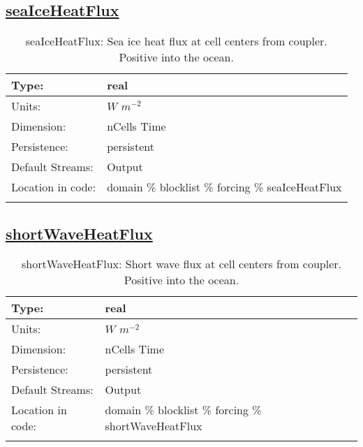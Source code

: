 \subsection[seaIceHeatFlux]{\hyperref[sec:var_tab_forcing]{seaIceHeatFlux}}
\label{subsec:var_sec_forcing_seaIceHeatFlux}
\begin{center}
\begin{longtable}{| p{2.0in} | p{4.0in} |}
        \hline 
        Type: & real \\
        \hline 
        Units: & $W$ $m^{-2}$ \\
        \hline 
        Dimension: & nCells Time \\
        \hline 
        Persistence: & persistent \\
        \hline 
		 Default Streams: & Output  \\
        \hline 
		 Location in code: & domain \% blocklist \% forcing \% seaIceHeatFlux \\
		 \hline 
    \caption{seaIceHeatFlux: Sea ice heat flux at cell centers from coupler. Positive into the ocean.}
\end{longtable}
\end{center}
\subsection[shortWaveHeatFlux]{\hyperref[sec:var_tab_forcing]{shortWaveHeatFlux}}
\label{subsec:var_sec_forcing_shortWaveHeatFlux}
\begin{center}
\begin{longtable}{| p{2.0in} | p{4.0in} |}
        \hline 
        Type: & real \\
        \hline 
        Units: & $W$ $m^{-2}$ \\
        \hline 
        Dimension: & nCells Time \\
        \hline 
        Persistence: & persistent \\
        \hline 
		 Default Streams: & Output  \\
        \hline 
		 Location in code: & domain \% blocklist \% forcing \% shortWaveHeatFlux \\
		 \hline 
    \caption{shortWaveHeatFlux: Short wave flux at cell centers from coupler. Positive into the ocean.}
\end{longtable}
\end{center}
